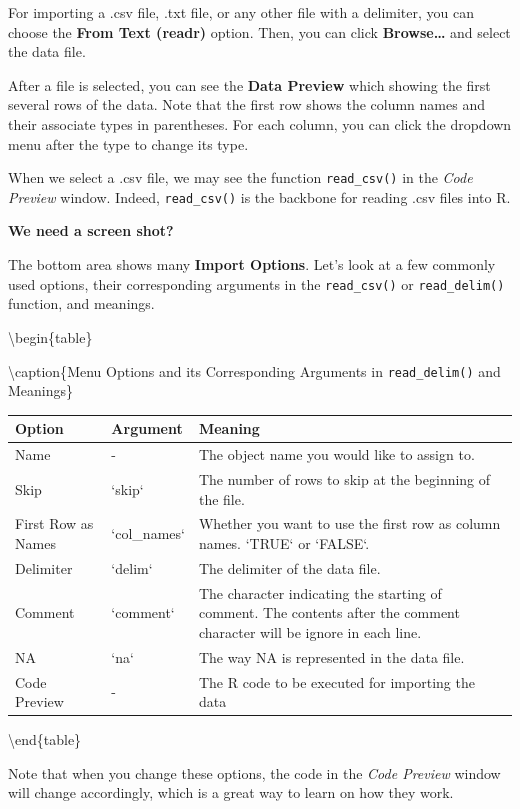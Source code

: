 \documentclass[
]{book}
\begin{document}
For importing a .csv file, .txt file, or any other file with a delimiter, you can choose the \textbf{From Text (readr)} option. Then, you can click \textbf{Browse\ldots{}} and select the data file.

After a file is selected, you can see the \textbf{Data Preview} which showing the first several rows of the data. Note that the first row shows the column names and their associate types in parentheses. For each column, you can click the dropdown menu after the type to change its type.

When we select a .csv file, we may see the function \texttt{read\_csv()} in the \emph{Code Preview} window. Indeed, \texttt{read\_csv()} is the backbone for reading .csv files into R.

\textbf{We need a screen shot?}

The bottom area shows many \textbf{Import Options}. Let's look at a few commonly used options, their corresponding arguments in the \texttt{read\_csv()} or \texttt{read\_delim()} function, and meanings.

\textbackslash begin\{table\}

\textbackslash caption\{\label{tab:importOptions}Menu Options and its Corresponding Arguments in \texttt{read\_delim()} and Meanings\}
\centering

\begin{tabular}[t]{l|l|l}
\hline
Option & Argument & Meaning\\
\hline
Name & - & The object name you would like to assign to.\\
\hline
Skip & `skip` & The number of rows to skip at the beginning of the file.\\
\hline
First Row as Names & `col\_names` & Whether you want to use the first row as column names. `TRUE` or `FALSE`.\\
\hline
Delimiter & `delim` & The delimiter of the data file.\\
\hline
Comment & `comment` & The character indicating the starting of comment. The contents after the comment character will be ignore in each line.\\
\hline
NA & `na` & The way NA is represented in the data file.\\
\hline
Code Preview & - & The R code to be executed for importing the data\\
\hline
\end{tabular}

\textbackslash end\{table\}

Note that when you change these options, the code in the \emph{Code Preview} window will change accordingly, which is a great way to learn on how they work.
\end{document}
